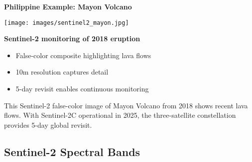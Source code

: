 \documentclass[
  letterpaper,
  DIV=11,
  numbers=noendperiod]{scrartcl}
\providecommand{\tightlist}{%
  \setlength{\itemsep}{0pt}\setlength{\parskip}{0pt}}
\begin{document}
\textbf{Philippine Example: Mayon Volcano}

\begin{center}
\texttt{[image: images/sentinel2\_mayon.jpg]}
\end{center}

\textbf{Sentinel-2 monitoring of 2018 eruption}

\begin{itemize}
\tightlist
\item
  False-color composite highlighting lava flows
\item
  10m resolution captures detail
\item
  5-day revisit enables continuous monitoring
\end{itemize}

This Sentinel-2 false-color image of Mayon Volcano from 2018 shows
recent lava flows. With Sentinel-2C operational in 2025, the
three-satellite constellation provides 5-day global revisit.

\subsection{Sentinel-2 Spectral Bands}\label{sentinel-2-spectral-bands}
\end{document}

